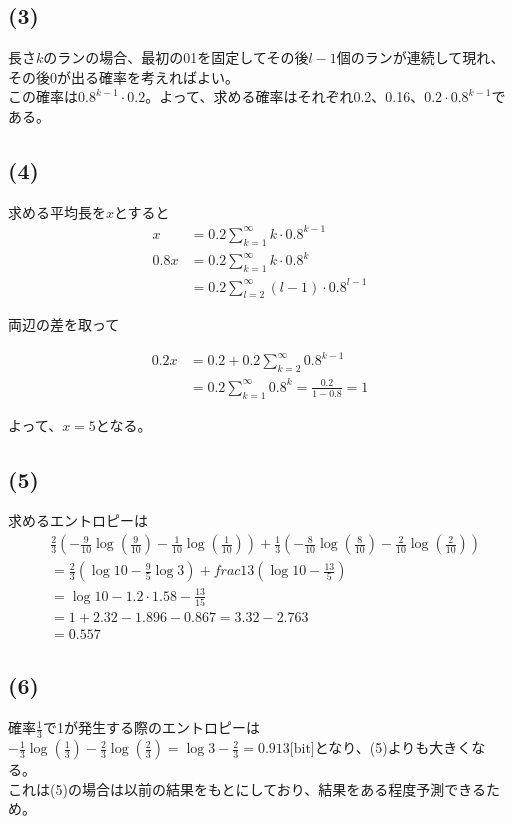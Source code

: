 \documentclass[a4paper,12pt,xelatex,ja=standard]{bxjsarticle}
\begin{document}
\subsection*{(3)}
長さ$k$のランの場合、最初の01を固定してその後$l-1$個のランが連続して現れ、その後0が出る確率を考えればよい。\\
この確率は$0.8^{k-1} \cdot 0.2$。よって、求める確率はそれぞれ0.2、0.16、$0.2 \cdot 0.8^{k-1}$である。

\subsection*{(4)}
求める平均長を$x$とすると
\begin{equation*}
  \begin{split}
    x &= 0.2 \sum^{\infty}_{k=1}k \cdot 0.8^{k-1}\\
    0.8x &= 0.2 \sum^{\infty}_{k=1}k \cdot 0.8^{k} \\
      &= 0.2 \sum^{\infty}_{l=2}(l-1) \cdot 0.8^{l-1}
  \end{split}
\end{equation*}

両辺の差を取って

\begin{equation*}
  \begin{split}
    0.2x &= 0.2 + 0.2 \sum^{\infty}_{k=2} 0.8^{k-1}\\
      &= 0.2 \sum^{\infty}_{k=1} 0.8^{k} = \frac{0.2}{1 - 0.8} = 1
  \end{split}
\end{equation*}

よって、$x=5$となる。

\subsection*{(5)}
求めるエントロピーは
\begin{equation*}
  \begin{split}
    &\frac{2}{3}\left(-\frac{9}{10} \log (\frac{9}{10}) - \frac{1}{10} \log (\frac{1}{10})\right) + \frac{1}{3}\left(-\frac{8}{10} \log (\frac{8}{10}) - \frac{2}{10} \log (\frac{2}{10})\right) \\
      &= \frac{2}{3}(\log 10 - \frac{9}{5} \log 3) + frac{1}{3}(\log 10 - \frac{13}{5})\\
      &= \log 10 - 1.2 \cdot 1.58 - \frac{13}{15} \\
      &= 1 + 2.32 - 1.896 - 0.867 = 3.32 - 2.763 \\
      &= 0.557
  \end{split}
\end{equation*}

\subsection*{(6)}
確率$\frac{1}{3}$で1が発生する際のエントロピーは$- \frac{1}{3} \log (\frac{1}{3}) - \frac{2}{3} \log (\frac{2}{3}) = \log 3 - \frac{2}{3} = 0.913 \text{[bit]}$となり、(5)よりも大きくなる。\\
これは(5)の場合は以前の結果をもとにしており、結果をある程度予測できるため。
\end{document}
